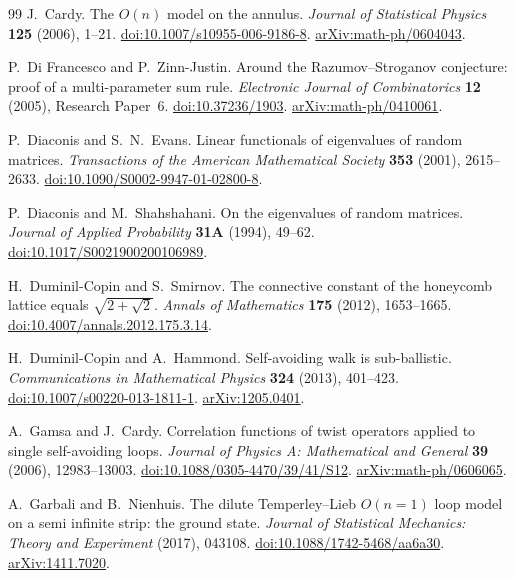 \begin{thebibliography}{99}
J.~Cardy. The $O(n)$ model on the annulus.
\emph{Journal of Statistical Physics} \textbf{125} (2006), 1--21.
\href{https://doi.org/10.1007/s10955-006-9186-8}{doi:10.1007/s10955-006-9186-8}.
\href{https://arxiv.org/abs/math-ph/0604043}{arXiv:math-ph/0604043}.

P.~Di Francesco and P.~Zinn-Justin.
Around the Razumov--Stroganov conjecture: proof of a multi-parameter sum rule.
\emph{Electronic Journal of Combinatorics} \textbf{12} (2005), Research Paper~6.
\href{https://doi.org/10.37236/1903}{doi:10.37236/1903}.
\href{https://arxiv.org/abs/math-ph/0410061}{arXiv:math-ph/0410061}.

P.~Diaconis and S.~N.~Evans.
Linear functionals of eigenvalues of random matrices.
\emph{Transactions of the American Mathematical Society}
\textbf{353} (2001), 2615--2633.
\mbox{\href{https://doi.org/10.1090/S0002-9947-01-02800-8}{doi:10.1090/S0002-9947-01-02800-8}}.

P.~Diaconis and M.~Shahshahani.
On the eigenvalues of random matrices.
\emph{Journal of Applied Probability} \textbf{31A} (1994), 49--62.
\href{https://doi.org/10.1017/S0021900200106989}{doi:10.1017/S0021900200106989}.

H.~Duminil-Copin and S.~Smirnov.
The connective constant of the honeycomb lattice equals $\sqrt{2+\sqrt2}$.
\emph{Annals of Mathematics} \textbf{175} (2012), 1653--1665.
\href{https://doi.org/10.4007/annals.2012.175.3.14}{doi:10.4007/annals.2012.175.3.14}.

H.~Duminil-Copin and A.~Hammond. Self-avoiding walk is sub-ballistic.
\emph{Communications in Mathematical Physics} \textbf{324} (2013), 401--423.
\href{https://doi.org/10.1007/s00220-013-1811-1}{doi:10.1007/s00220-013-1811-1}.
\href{https://arxiv.org/abs/1205.0401}{arXiv:1205.0401}.

A.~Gamsa and J.~Cardy.
Correlation functions of twist operators applied to single self-avoiding loops.
\emph{Journal of Physics A: Mathematical and General}
\textbf{39} (2006), 12983--13003.
\href{https://doi.org/10.1088/0305-4470/39/41/S12}{doi:10.1088/0305-4470/39/41/S12}.
\href{https://arxiv.org/abs/math-ph/0606065}{arXiv:math-ph/0606065}.

A.~Garbali and B.~Nienhuis.
The dilute Temperley--Lieb $O(n=1)$ loop model on a semi infinite strip:
the ground state.
\emph{Journal of Statistical Mechanics: Theory and Experiment} (2017), 043108.
\href{https://doi.org/10.1088/1742-5468/aa6a30}{doi:10.1088/1742-5468/aa6a30}.
\href{https://arxiv.org/abs/1411.7020}{arXiv:1411.7020}.


\end{thebibliography}
